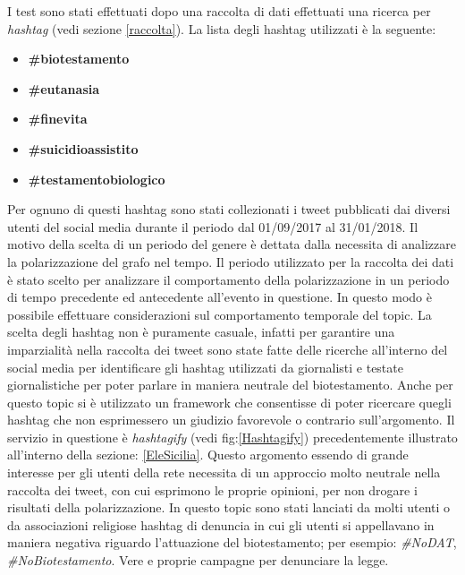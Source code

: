 I test sono stati effettuati dopo una raccolta di dati effettuati una ricerca per \textit{hashtag} (vedi sezione \ref{raccolta}). La lista degli hashtag utilizzati è la seguente:
\begin{itemize}
\item \textbf{\#biotestamento}
\item \textbf{\#eutanasia}
\item \textbf{\#finevita}
\item \textbf{\#suicidioassistito}
\item \textbf{\#testamentobiologico}
\end{itemize}
Per ognuno di questi hashtag sono stati collezionati i tweet pubblicati dai diversi utenti del social media durante il periodo dal 01/09/2017 al 31/01/2018.
Il motivo della scelta di un periodo del genere è dettata dalla necessita di analizzare la polarizzazione del grafo nel tempo. Il periodo utilizzato per la raccolta dei dati è stato scelto per analizzare il comportamento della polarizzazione in un periodo di tempo precedente ed antecedente all'evento in questione. In questo modo è possibile effettuare considerazioni sul comportamento temporale del topic.
La scelta degli hashtag non è puramente casuale, infatti per garantire una imparzialità nella raccolta dei tweet sono state fatte delle ricerche all'interno del social media per identificare gli hashtag utilizzati da giornalisti e testate giornalistiche per poter parlare in maniera neutrale del biotestamento.
Anche per questo topic si è utilizzato un framework che consentisse di poter ricercare quegli hashtag che non esprimessero un giudizio favorevole o contrario sull'argomento. Il servizio in questione è \textit{hashtagify} (vedi fig:\ref{Hashtagify}) precedentemente illustrato all'interno della sezione: \ref{EleSicilia}.
Questo argomento essendo di grande interesse per gli utenti della rete necessita di un approccio molto neutrale nella raccolta dei tweet, con cui esprimono le proprie opinioni, per non drogare i risultati della polarizzazione.
In questo topic sono stati lanciati da molti utenti o da associazioni religiose hashtag di denuncia in cui gli utenti si appellavano in maniera negativa riguardo l'attuazione del biotestamento; per esempio: \textit{\#NoDAT}, \textit{\#NoBiotestamento}. Vere e proprie campagne per denunciare la legge.

